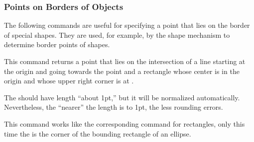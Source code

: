 \subsubsection{Points on Borders of Objects}

The following commands are useful for specifying a point that lies on
the border of special shapes. They are used, for example, by the shape
mechanism to determine border points of shapes.

\begin{command}{\pgfpointborderrectangle{}}
  This command returns a point that lies on the intersection of a line
  starting at the origin and going towards the point  and a rectangle whose center is in the origin and whose
  upper right corner is at .

  The  should have length ``about 1pt,'' but it
  will be normalized automatically. Nevertheless, the ``nearer'' the
  length is to 1pt, the less rounding errors.

\begin{codeexample}[]
\end{codeexample}
\end{command}


\begin{command}{\pgfpointborderellipse{}}
  This command works like the corresponding command for rectangles,
  only this time the  is the corner of the bounding
  rectangle of an ellipse.

\begin{codeexample}[]
\end{codeexample}
\end{command}



